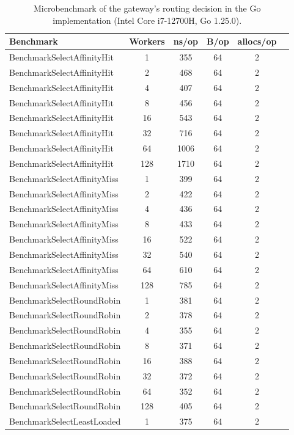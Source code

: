 \begin{table}[t]
\centering
\scriptsize
\setlength{\tabcolsep}{2.5pt}
\caption{Microbenchmark of the gateway's routing decision in the Go implementation (Intel Core i7-12700H, Go 1.25.0).}
\label{tab:router-bench}
\begin{tabular}{lccccc}
\toprule
Benchmark & Workers & ns/op & B/op & allocs/op \\
\midrule
BenchmarkSelectAffinityHit & 1 & 355 & 64 & 2 \\
BenchmarkSelectAffinityHit & 2 & 468 & 64 & 2 \\
BenchmarkSelectAffinityHit & 4 & 407 & 64 & 2 \\
BenchmarkSelectAffinityHit & 8 & 456 & 64 & 2 \\
BenchmarkSelectAffinityHit & 16 & 543 & 64 & 2 \\
BenchmarkSelectAffinityHit & 32 & 716 & 64 & 2 \\
BenchmarkSelectAffinityHit & 64 & 1006 & 64 & 2 \\
BenchmarkSelectAffinityHit & 128 & 1710 & 64 & 2 \\
BenchmarkSelectAffinityMiss & 1 & 399 & 64 & 2 \\
BenchmarkSelectAffinityMiss & 2 & 422 & 64 & 2 \\
BenchmarkSelectAffinityMiss & 4 & 436 & 64 & 2 \\
BenchmarkSelectAffinityMiss & 8 & 433 & 64 & 2 \\
BenchmarkSelectAffinityMiss & 16 & 522 & 64 & 2 \\
BenchmarkSelectAffinityMiss & 32 & 540 & 64 & 2 \\
BenchmarkSelectAffinityMiss & 64 & 610 & 64 & 2 \\
BenchmarkSelectAffinityMiss & 128 & 785 & 64 & 2 \\
BenchmarkSelectRoundRobin & 1 & 381 & 64 & 2 \\
BenchmarkSelectRoundRobin & 2 & 378 & 64 & 2 \\
BenchmarkSelectRoundRobin & 4 & 355 & 64 & 2 \\
BenchmarkSelectRoundRobin & 8 & 371 & 64 & 2 \\
BenchmarkSelectRoundRobin & 16 & 388 & 64 & 2 \\
BenchmarkSelectRoundRobin & 32 & 372 & 64 & 2 \\
BenchmarkSelectRoundRobin & 64 & 352 & 64 & 2 \\
BenchmarkSelectRoundRobin & 128 & 405 & 64 & 2 \\
BenchmarkSelectLeastLoaded & 1 & 375 & 64 & 2 \\

\end{tabular}
\end{table}
